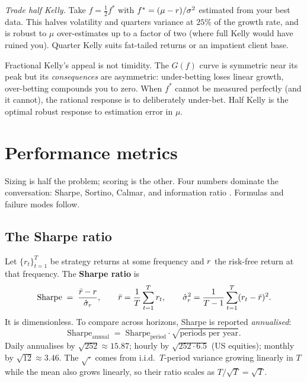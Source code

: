 \begin{keyfactbox}
\emph{Trade half Kelly.} Take $f = \tfrac12 f^{*}$ with
$f^{*} = (\mu - r)/\sigma^2$ estimated from your best data.
This halves volatility and quarters variance at $25\%$ of the
growth rate, and is robust to $\mu$ over-estimates up to a factor
of two (where full Kelly would have ruined you). Quarter Kelly
suits fat-tailed returns or an impatient client base.
\end{keyfactbox}

\begin{intuitionbox}
Fractional Kelly's appeal is not timidity. The $G(f)$ curve is
symmetric near its peak but its \emph{consequences} are
asymmetric: under-betting loses linear growth, over-betting
compounds you to zero. When $f^{*}$ cannot be measured
perfectly (and it cannot), the rational response is to
deliberately under-bet. Half Kelly is the optimal robust response
to estimation error in $\mu$.
\end{intuitionbox}

\section{Performance metrics}
\label{sec:perf_metrics}

Sizing is half the problem; scoring is the other. Four numbers
dominate the conversation: Sharpe, Sortino, Calmar, and
information ratio \citeChan. Formulas and failure modes follow.

\subsection{The Sharpe ratio}

Let $\{r_t\}_{t=1}^T$ be strategy returns at some frequency and
$r$ the risk-free return at that frequency. The
\textbf{Sharpe ratio} is
\begin{equation}
  \text{Sharpe} \;=\;
  \frac{\bar r - r}{\hat{\sigma}_r},
  \qquad
  \bar r = \frac{1}{T}\sum_{t=1}^T r_t,
  \qquad
  \hat{\sigma}_r^2 = \frac{1}{T-1}\sum_{t=1}^T (r_t - \bar r)^2.
\end{equation}
It is dimensionless. To compare across horizons, Sharpe is
reported \emph{annualised}:
\begin{equation}
  \text{Sharpe}_{\text{annual}} \;=\;
  \text{Sharpe}_{\text{period}} \cdot \sqrt{\text{periods per year}}.
\end{equation}
Daily annualises by $\sqrt{252} \approx 15.87$; hourly by
$\sqrt{252 \cdot 6.5}$ (US equities); monthly by $\sqrt{12}
\approx 3.46$. The $\sqrt{\cdot}$ comes from i.i.d.\ $T$-period
variance growing linearly in $T$ while the mean also grows
linearly, so their ratio scales as $T/\sqrt{T} = \sqrt{T}$.

